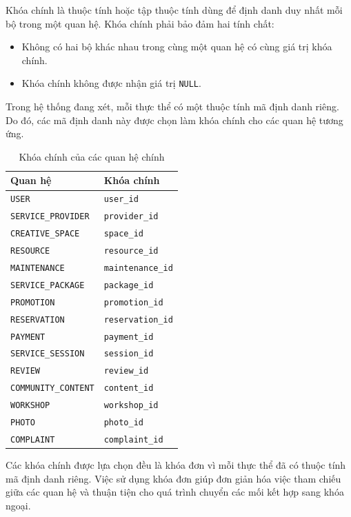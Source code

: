 Khóa chính là thuộc tính hoặc tập thuộc tính dùng để định danh duy nhất mỗi bộ trong một quan hệ. Khóa chính phải bảo đảm hai tính chất:

\begin{itemize}
    \item Không có hai bộ khác nhau trong cùng một quan hệ có cùng giá trị khóa chính.
    \item Khóa chính không được nhận giá trị \texttt{NULL}.
\end{itemize}

Trong hệ thống đang xét, mỗi thực thể có một thuộc tính mã định danh riêng. Do đó, các mã định danh này được chọn làm khóa chính cho các quan hệ tương ứng.

\begin{table}[htbp]
\centering
\begin{tabular}{|l|l|}
\hline
\textbf{Quan hệ} & \textbf{Khóa chính} \\
\hline
\texttt{USER} & \texttt{user\_id} \\
\hline
\texttt{SERVICE\_PROVIDER} & \texttt{provider\_id} \\
\hline
\texttt{CREATIVE\_SPACE} & \texttt{space\_id} \\
\hline
\texttt{RESOURCE} & \texttt{resource\_id} \\
\hline
\texttt{MAINTENANCE} & \texttt{maintenance\_id} \\
\hline
\texttt{SERVICE\_PACKAGE} & \texttt{package\_id} \\
\hline
\texttt{PROMOTION} & \texttt{promotion\_id} \\
\hline
\texttt{RESERVATION} & \texttt{reservation\_id} \\
\hline
\texttt{PAYMENT} & \texttt{payment\_id} \\
\hline
\texttt{SERVICE\_SESSION} & \texttt{session\_id} \\
\hline
\texttt{REVIEW} & \texttt{review\_id} \\
\hline
\texttt{COMMUNITY\_CONTENT} & \texttt{content\_id} \\
\hline
\texttt{WORKSHOP} & \texttt{workshop\_id} \\
\hline
\texttt{PHOTO} & \texttt{photo\_id} \\
\hline
\texttt{COMPLAINT} & \texttt{complaint\_id} \\
\hline
\end{tabular}
\caption{Khóa chính của các quan hệ chính}
\end{table}

Các khóa chính được lựa chọn đều là khóa đơn vì mỗi thực thể đã có thuộc tính mã định danh riêng. Việc sử dụng khóa đơn giúp đơn giản hóa việc tham chiếu giữa các quan hệ và thuận tiện cho quá trình chuyển các mối kết hợp sang khóa ngoại.

